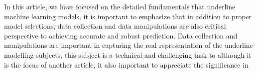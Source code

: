 
\par
In this article, we have focused on the detailed fundamentals that underline machine learning models, it is important to emphasize that in addition to proper model selections, data collection and data manipulations are also critical perspective to achieving accurate and robust prediction. Data collection and manipulations are important in capturing the real representation of the underline modelling subjects, this subject is a technical and challenging task to   although it is the focus of another article, it also important to appreciate the significance in 
\par 
